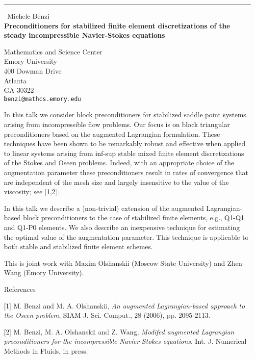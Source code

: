 \documentclass{report}
\begin{document}
\begin{center}
\rule{6in}{1pt} \
{\large Michele Benzi \\
{\bf Preconditioners for stabilized finite element discretizations of the steady incompressible Navier-Stokes equations}}

Mathematics and Science Center \\ Emory University \\ 400 Dowman Drive \\ Atlanta \\ GA 30322
\\
{\tt benzi@mathcs.emory.edu}\end{center}

In this talk we consider block preconditioners for stabilized
saddle point systems arising from incompressible flow problems.
Our focus is on block triangular preconditioners based on the
augmented Lagrangian formulation. These techniques have been
shown to be remarkably robust and effective when applied to
linear systems arising from inf-sup stable mixed finite element
discretizations of the Stokes and Oseen problems. Indeed, with an
appropriate choice of the augmentation parameter these
preconditioners result in rates of convergence that are
independent of the mesh size and largely insensitive to
the value of the viscosity; see [1,2].

In this talk we describe a (non-trivial) extension of the
augmented Lagrangian-based block preconditioners to the
case of stabilized finite elements, e.g., Q1-Q1 and Q1-P0
elements. We also describe an inexpensive technique for
estimating the optimal value of the augmentation parameter.
This technique is applicable to both stable and stabilized
finite element schemes.

This is joint work with Maxim Olshanskii (Moscow State
University) and Zhen Wang (Emory University).

References

[1] M. Benzi and M. A. Olshanskii, {\em An augmented Lagrangian-based
approach to the Oseen problem}, SIAM J. Sci. Comput., 28 (2006),
pp. 2095-2113.

[2] M. Benzi, M. A. Olshanskii and Z. Wang, {\em Modifed augmented
Lagrangian preconditioners for the incompressible Navier-Stokes
equations}, Int. J. Numerical Methods in Fluids, in press.
\end{document}

